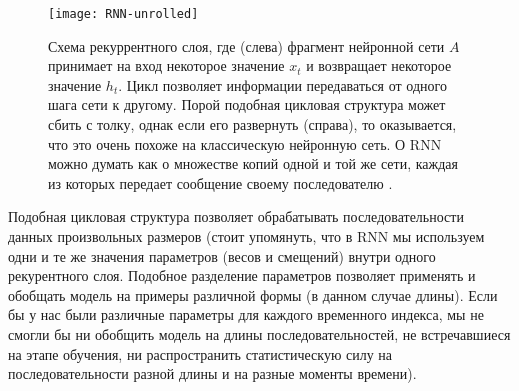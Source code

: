 \begin{figure}[h!]
    \centering
    \texttt{[image: RNN-unrolled]}
    \caption{Схема рекуррентного слоя, где (слева)
    фрагмент нейронной сети $A$ принимает на вход некоторое значение $x_t$ 
    и возвращает некоторое значение $h_t$. Цикл позволяет информации 
    передаваться от одного шага сети к другому. Порой подобная 
    цикловая структура может сбить с толку, однак если его развернуть 
    (справа), то оказывается, что это очень похоже на классическую нейронную 
    сеть. О RNN можно думать как о множестве копий одной и той же сети, 
    каждая из которых передает сообщение своему последователю \cite{colah2}.}
    \label{fig:RNN-unrolled}
\end{figure}

Подобная цикловая структура позволяет обрабатывать последовательности 
данных произвольных размеров (стоит упомянуть, что в RNN мы используем 
одни и те же значения параметров (весов и смещений) 
внутри одного рекурентного слоя. Подобное разделение параметров позволяет 
применять и обобщать модель на примеры различной формы 
(в данном случае длины). Если бы у нас были различные параметры для 
каждого временного индекса, мы не смогли бы ни обобщить
модель на длины последовательностей, не встречавшиеся на этапе обучения, ни 
распространить статистическую силу на последовательности разной длины и 
на разные моменты времени).




